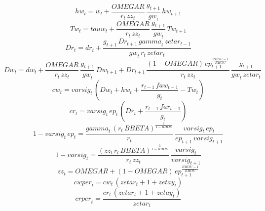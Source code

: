 \begin{dmath}
{hw}_{t}={w}_{t}+\frac{{OMEGAR}}{{r}_{t}\, {zz}_{t}}\, \frac{{g}_{t+1}}{{gw}_{t}}\, {hw}_{t+1}
\end{dmath}
\begin{dmath}
{Tw}_{t}={tauw}_{t}+\frac{{OMEGAR}}{{r}_{t}\, {zz}_{t}}\, \frac{{g}_{t+1}}{{gw}_{t}}\, {Tw}_{t+1}
\end{dmath}
\begin{dmath}
{Dr}_{t}={dr}_{t}+\frac{{g}_{t+1}\, {Dr}_{t+1}\, {gamma}_{t}\, {zetar}_{t-1}}{{gw}_{t}\, {r}_{t}\, {zetar}_{t}}
\end{dmath}
\begin{dmath}
{Dw}_{t}={dw}_{t}+\frac{{OMEGAR}}{{r}_{t}\, {zz}_{t}}\, \frac{{g}_{t+1}}{{gw}_{t}}\, {Dw}_{t+1}+{Dr}_{t+1}\, \frac{\left(1-{OMEGAR}\right)\, {ep}_{t+1}^{\frac{{RHOU}-1}{{RHOU}}}}{{r}_{t}\, {zz}_{t}}\, \frac{{g}_{t+1}}{{gw}_{t}\, {zetar}_{t}}
\end{dmath}
\begin{dmath}
{cw}_{t}={varsig}_{t}\, \left({Dw}_{t}+{hw}_{t}+\frac{{r}_{t-1}\, {faw}_{t-1}}{{g}_{t}}-{Tw}_{t}\right)
\end{dmath}
\begin{dmath}
{cr}_{t}={varsig}_{t}\, {ep}_{t}\, \left({Dr}_{t}+\frac{{r}_{t-1}\, {far}_{t-1}}{{g}_{t}}\right)
\end{dmath}
\begin{dmath}
1-{varsig}_{t}\, {ep}_{t}=\frac{{gamma}_{t}\, \left({r}_{t}\, {BBETA}\right)^{\frac{1}{1-{RHOU}}}}{{r}_{t}}\, \frac{{varsig}_{t}\, {ep}_{t}}{{ep}_{t+1}\, {varsig}_{t+1}}
\end{dmath}
\begin{dmath}
1-{varsig}_{t}=\frac{\left({zz}_{t}\, {r}_{t}\, {BBETA}\right)^{\frac{1}{1-{RHOU}}}}{{r}_{t}\, {zz}_{t}}\, \frac{{varsig}_{t}}{{varsig}_{t+1}}
\end{dmath}
\begin{dmath}
{zz}_{t}={OMEGAR}+\left(1-{OMEGAR}\right)\, {ep}_{t+1}^{\frac{{RHOU}-1}{{RHOU}}}
\end{dmath}
\begin{dmath}
{cwper}_{t}={cw}_{t}\, \left({zetar}_{t}+1+{zetay}_{t}\right)
\end{dmath}
\begin{dmath}
{crper}_{t}=\frac{{cr}_{t}\, \left({zetar}_{t}+1+{zetay}_{t}\right)}{{zetar}_{t}}
\end{dmath}
